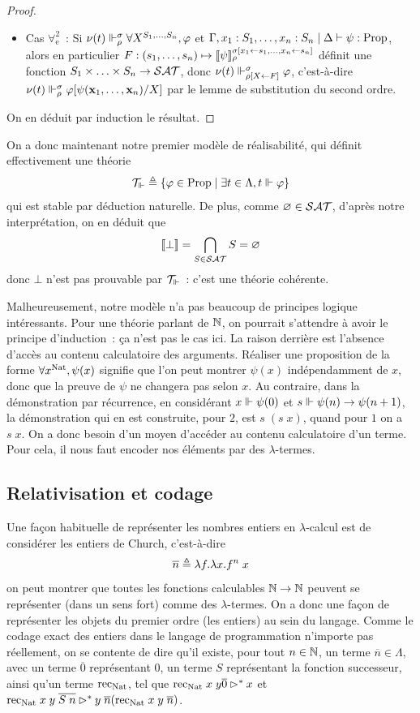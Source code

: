 \documentclass{article}
\begin{document}
\begin{proof}
\begin{itemize}
  \item Cas $\forall_\mathrm e^2$~: Si $\nu(t)\Vdash_\rho^\sigma \forall X^{S_1,\ldots,S_n}, \varphi$ et $\Gamma,x_1 : S_1,\ldots,x_n : S_n\mid\Delta\vdash \psi : \mathrm{Prop}$, alors en particulier $F : (s_1,\ldots,s_n) \mapsto \llbracket \psi \rrbracket_\rho^{\sigma[x_1\leftarrow s_1,\ldots, x_n \leftarrow s_n]}$ définit une fonction $S_1\times\ldots\times S_n \to\mathcal {SAT}$, donc $\nu(t)\Vdash_{\rho[X\leftarrow F]}^\sigma \varphi$, c'est-à-dire $\nu(t)\Vdash_\rho^\sigma \varphi[\psi(\mathbf{x}_1,\ldots,\mathbf{x}_n)/X]$ par le lemme de substitution du second ordre.
  \end{itemize}

  On en déduit par induction le résultat.
\end{proof}

On a donc maintenant notre premier modèle de réalisabilité, qui définit effectivement une théorie
\[\mathcal T_\Vdash \triangleq \{\varphi \in \mathrm{Prop}\mid \exists t \in \Lambda, t \Vdash \varphi\}\]
qui est stable par déduction naturelle. De plus, comme $\varnothing \in \mathcal {SAT}$, d'après notre interprétation, on en déduit que
\[\llbracket \bot \rrbracket = \bigcap_{S \in \mathcal {SAT}} S = \varnothing\]
donc $\bot$ n'est pas prouvable par $\mathcal T_\Vdash$~: c'est une théorie cohérente.

Malheureusement, notre modèle n'a pas beaucoup de principes logique intéressants. Pour une théorie parlant de $\mathbb{N}$, on pourrait s'attendre à avoir le principe d'induction~: ça n'est pas le cas ici. La raison derrière est l'absence d'accès au contenu calculatoire des arguments. Réaliser une proposition de la forme $\forall x^{\mathrm{Nat}}, \psi(x)$ signifie que l'on peut montrer $\psi(x)$ indépendamment de $x$, donc que la preuve de $\psi$ ne changera pas selon $x$. Au contraire, dans la démonstration par récurrence, en considérant $x\Vdash \psi(0)$ et $s \Vdash \psi(n) \to \psi(n+1)$, la démonstration qui en est construite, pour $2$, est $s\;(s\;x)$, quand pour $1$ on a $s\;x$. On a donc besoin d'un moyen d'accéder au contenu calculatoire d'un terme. Pour cela, il nous faut encoder nos éléments par des $\lambda$-termes.

\subsection{Relativisation et codage}

Une façon habituelle de représenter les nombres entiers en $\lambda$-calcul est de considérer les entiers de Church, c'est-à-dire
\[\overline n \triangleq \lambda f.\lambda x.f^n\;x\]
on peut montrer que toutes les fonctions calculables $\mathbb{N}\to\mathbb{N}$ peuvent se représenter (dans un sens fort) comme des $\lambda$-termes. On a donc une façon de représenter les objets du premier ordre (les entiers) au sein du langage. Comme le codage exact des entiers dans le langage de programmation n'importe pas réellement, on se contente de dire qu'il existe, pour tout $n\in \mathbb{N}$, un terme $\overline n \in \Lambda$, avec un terme $\overline 0$ représentant $0$, un terme $S$ représentant la fonction successeur, ainsi qu'un terme $\mathrm{rec}_{\mathrm{Nat}}$, tel que $\mathrm{rec}_{\mathrm{Nat}}\;x\;y \overline 0 \rhd^* x$ et $\mathrm{rec}_{\mathrm{Nat}}\;x\;y\;\overline{S\;n}\rhd^* y\;\overline n (\mathrm{rec}_{\mathrm{Nat}}\;x\;y\;\overline n)$.
\end{document}
